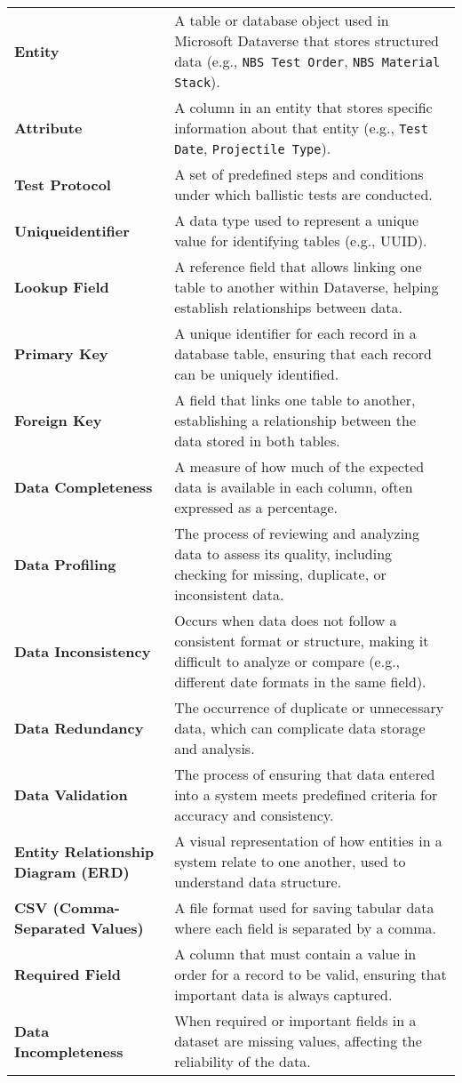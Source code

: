 \begin{small}
\begin{longtable}{m{5cm} | m{9cm}}
        \textbf{Entity} & A table or database object used in Microsoft Dataverse that stores structured data (e.g., \texttt{NBS Test Order}, \texttt{NBS Material Stack}). \\[2em]
        \textbf{Attribute} & A column in an entity that stores specific information about that entity (e.g., \texttt{Test Date}, \texttt{Projectile Type}). \\[2em]
        \textbf{Test Protocol} & A set of predefined steps and conditions under which ballistic tests are conducted. \\[2em]
        \textbf{Uniqueidentifier} & A data type used to represent a unique value for identifying tables (e.g., UUID). \\[2em]
        \textbf{Lookup Field} & A reference field that allows linking one table to another within Dataverse, helping establish relationships between data. \\[2em]
        \textbf{Primary Key} & A unique identifier for each record in a database table, ensuring that each record can be uniquely identified. \\[2em]
        \textbf{Foreign Key} & A field that links one table to another, establishing a relationship between the data stored in both tables. \\[2em]
        \textbf{Data Completeness} & A measure of how much of the expected data is available in each column, often expressed as a percentage. \\[2em]
        \textbf{Data Profiling} & The process of reviewing and analyzing data to assess its quality, including checking for missing, duplicate, or inconsistent data. \\[2em]
        \textbf{Data Inconsistency} & Occurs when data does not follow a consistent format or structure, making it difficult to analyze or compare (e.g., different date formats in the same field). \\[2em]
        \textbf{Data Redundancy} & The occurrence of duplicate or unnecessary data, which can complicate data storage and analysis. \\[2em]
        \textbf{Data Validation} & The process of ensuring that data entered into a system meets predefined criteria for accuracy and consistency. \\[2em]
        \textbf{Entity Relationship Diagram (ERD)} & A visual representation of how entities in a system relate to one another, used to understand data structure. \\[2em]
        \textbf{CSV (Comma-Separated Values)} & A file format used for saving tabular data where each field is separated by a comma. \\[2em]
        \textbf{Required Field} & A column that must contain a value in order for a record to be valid, ensuring that important data is always captured. \\[2em]
        \textbf{Data Incompleteness} & When required or important fields in a dataset are missing values, affecting the reliability of the data. \\[2em]
    \end{longtable}
\end{small}